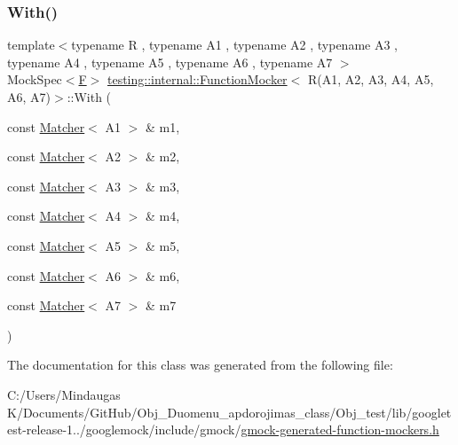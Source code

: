 \subsubsection{\texorpdfstring{With()}{With()}}
{\footnotesize\ttfamily template$<$typename R , typename A1 , typename A2 , typename A3 , typename A4 , typename A5 , typename A6 , typename A7 $>$ \\
Mock\+Spec$<$\mbox{\hyperlink{classtesting_1_1internal_1_1_function_mocker_3_01_r_07_a1_00_01_a2_00_01_a3_00_01_a4_00_01_a5_00_01_a6_00_01_a7_08_4_a2ea0e33d9cc0d1f57d58b4aee98c117c}{F}}$>$ \mbox{\hyperlink{classtesting_1_1internal_1_1_function_mocker}{testing\+::internal\+::\+Function\+Mocker}}$<$ R(A1, A2, A3, A4, A5, A6, A7)$>$\+::With (\begin{DoxyParamCaption}\item[{const \mbox{\hyperlink{classtesting_1_1_matcher}{Matcher}}$<$ A1 $>$ \&}]{m1,  }\item[{const \mbox{\hyperlink{classtesting_1_1_matcher}{Matcher}}$<$ A2 $>$ \&}]{m2,  }\item[{const \mbox{\hyperlink{classtesting_1_1_matcher}{Matcher}}$<$ A3 $>$ \&}]{m3,  }\item[{const \mbox{\hyperlink{classtesting_1_1_matcher}{Matcher}}$<$ A4 $>$ \&}]{m4,  }\item[{const \mbox{\hyperlink{classtesting_1_1_matcher}{Matcher}}$<$ A5 $>$ \&}]{m5,  }\item[{const \mbox{\hyperlink{classtesting_1_1_matcher}{Matcher}}$<$ A6 $>$ \&}]{m6,  }\item[{const \mbox{\hyperlink{classtesting_1_1_matcher}{Matcher}}$<$ A7 $>$ \&}]{m7 }\end{DoxyParamCaption})\hspace{0.3cm}{\ttfamily [inline]}}



The documentation for this class was generated from the following file\+:\begin{DoxyCompactItemize}
\item 
C\+:/\+Users/\+Mindaugas K/\+Documents/\+Git\+Hub/\+Obj\+\_\+\+Duomenu\+\_\+apdorojimas\+\_\+class/\+Obj\+\_\+test/lib/googletest-\/release-\/1../googlemock/include/gmock/\mbox{\hyperlink{_obj__test_2lib_2googletest-release-1_88_81_2googlemock_2include_2gmock_2gmock-generated-function-mockers_8h}{gmock-\/generated-\/function-\/mockers.\+h}}\end{DoxyCompactItemize}

